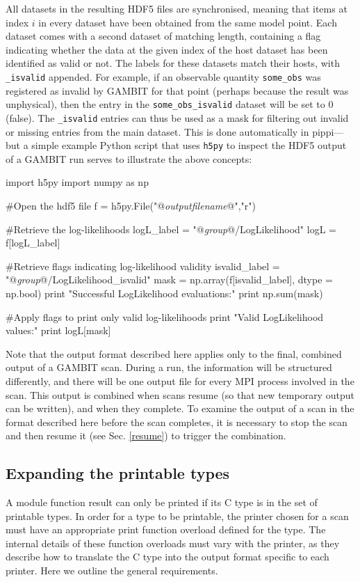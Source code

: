 \documentclass[pdftex,twocolumn,epjc3_preprint,runningheads]{svjour3}
\renewcommand{\_}{\discretionary{\underscore}{}{\underscore}}
\newcommand\term[1]{{\lstset{style=terminal}\lstinline!#1!\lstset{style=cpp}}}
\newcommand{\metavarf}[1]{\textit{\color{darkgreen}\footnotesize\textrm{#1}}}
\newcommand{\metavar}{\metavarf}
\newcommand{\gambit}{\textsf{GAMBIT}\xspace}
\newcommand{\GB}{\gambit}
\newcommand{\mpi}{\textsf{MPI}\xspace}
\newcommand\pippi{\textsf{pippi}\xspace}
\newcommand\xx{\raisebox{0.2ex}{\smaller ++}\xspace}
\newcommand\Cpp{\textsf{C\xx}\xspace}
\newcommand\Python{\textsf{Python}\xspace}
\newcommand\python{\Python}
\begin{document}
All datasets in the resulting \textsf{HDF5} files are synchronised, meaning that items at index $i$ in every dataset have been obtained from the same model point. Each dataset comes with a second dataset of matching length, containing a flag indicating whether the data at the given index of the host dataset has been identified as valid or not.  The labels for these datasets match their hosts, with \term{_isvalid} appended. For example, if an observable quantity \term{some_obs} was registered as invalid by \GB for that point (perhaps because the result was unphysical), then the entry in the \term{some_obs_isvalid} dataset will be set to $0$ (false). The \term{_isvalid} entries can thus be used as a mask for filtering out invalid or missing entries from the main dataset.  This is done automatically in \pippi --- but a simple example \python script that uses \term{h5py} to inspect the \textsf{HDF5} output of a \GB run serves to illustrate the above concepts:
\begin{lstpy}
import h5py
import numpy as np

#Open the hdf5 file
f = h5py.File("@\metavar{output\_filename}@","r")

#Retrieve the log-likelihoods
logL_label = "@\metavar{group}@/LogLikelihood"
logL = f[logL_label]

#Retrieve flags indicating log-likelihood validity
isvalid_label = "@\metavar{group}@/LogLikelihood_isvalid"
mask = np.array(f[isvalid_label], dtype = np.bool)
print "Successful LogLikelihood evaluations:"
print np.sum(mask)

#Apply flags to print only valid log-likelihoods
print "Valid LogLikelihood values:"
print logL[mask]
\end{lstpy}

Note that the output format described here applies only to the final, combined output of a \GB scan. During a run, the information will be structured differently, and there will be one output file for every \mpi process involved in the scan. This output is combined when scans resume (so that new temporary output can be written), and when they complete. To examine the output of a scan in the format described here before the scan completes, it is necessary to stop the scan and then resume it (see Sec. \ref{resume}) to trigger the combination.

\subsection{Expanding the printable types}
\label{print_overloads}
%
A module function result can only be printed if its \Cpp type is in the set of printable types. In order for a type to be printable, the printer chosen for a scan must have an appropriate print function overload defined for the type. The internal details of these function overloads must vary with the printer, as they describe how to translate the \Cpp type into the output format specific to each printer.  Here we outline the general requirements.
\end{document}

